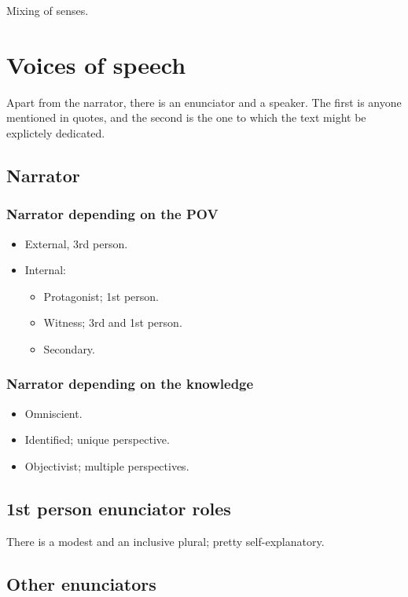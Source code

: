 \documentclass{article}
\begin{document}
Mixing of senses.

\section*{Voices of speech}

Apart from the narrator, there is an enunciator and a speaker.
The first is anyone mentioned in quotes, and the second is the one to which the
text might be explictely dedicated.

\subsection*{Narrator}

\subsubsection*{Narrator depending on the POV}

\begin{itemize}
    \item External, 3rd person.
    \item Internal:
    \begin{itemize}
        \item Protagonist; 1st person.
        \item Witness; 3rd and 1st person.
        \item Secondary.
    \end{itemize}
\end{itemize}

\subsubsection*{Narrator depending on the knowledge}

\begin{itemize}
    \item Omniscient.
    \item Identified; unique perspective.
    \item Objectivist; multiple perspectives.
\end{itemize}

\subsection*{1st person enunciator roles}

There is a modest and an inclusive plural; pretty self-explanatory.

\subsection*{Other enunciators}
\end{document}
